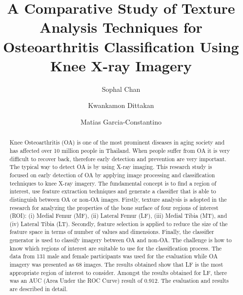 \documentclass[review]{elsarticle}
\begin{document}
\begin{frontmatter}

\title{A Comparative Study of Texture Analysis Techniques for Osteoarthritis Classification Using Knee X-ray Imagery}


\author[mymainaddress]{Sophal Chan}
\author[mymainaddress]{Kwankamon Dittakan}
\author[mysecondaryaddress]{Matias Garcia-Constantino}



\address[mymainaddress]{College of Computing, Prince of Songkla University, 80, Moo 1, Vichitsongkram Rd, Kathu, Phuket 83120, Thailand }
\address[mysecondaryaddress]{School of Computing, Ulster University, Shore Road, Newtownabbey, County Antrim, BT37 0QB, United Kingdom}

\begin{abstract}
Knee Osteoarthritis (OA) is one of the most prominent diseases in aging society and has affected over 10 million people in Thailand. When people suffer from OA it is very difficult to recover back, therefore early detection and prevention are very important. The typical way to detect OA is by using X-ray imaging. This research study is focused on early detection of OA by applying image processing and classification techniques to knee X-ray imagery. The fundamental concept is to find a region of interest, use feature extraction techniques and generate a classifier that is able to distinguish between OA or non-OA images. Firstly, texture analysis is adopted in the research for analyzing the properties of the bone surface of four regions of interest (ROI): (i) Medial Femur (MF), (ii) Lateral Femur (LF), (iii) Medial Tibia (MT), and (iv) Lateral Tibia (LT). Secondly, feature selection is applied to reduce the size of the feature space in terms of number of values and dimensions. Finally, the classifier generator is used to classify imagery between OA and non-OA. The challenge is how to know which regions of interest are suitable to use for the classification process. The data from 131 male and female participants was used for the evaluation while OA imagery was presented as 68 images. The results obtained show that LF is the most appropriate region of interest to consider. Amongst the results obtained for LF, there was an AUC (Area Under the ROC Curve) result of 0.912. The evaluation and results are described in detail.
\end{abstract}


\end{frontmatter}
\end{document}
